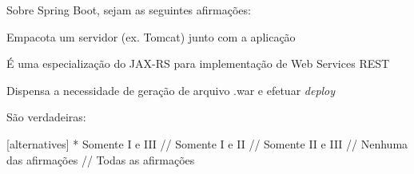 Sobre Spring Boot, sejam as seguintes afirmações:

\begin{statements}
\item Empacota um servidor (ex. Tomcat) junto com a aplicação
\item É uma especialização do JAX-RS para implementação de Web Services REST
\item Dispensa a necessidade de geração de arquivo .war e efetuar \textit{deploy}
\end{statements}

São verdadeiras:

[alternatives]
* Somente I e III
//
Somente I e II
//
Somente II e III
//
Nenhuma das afirmações
//
Todas as afirmações

